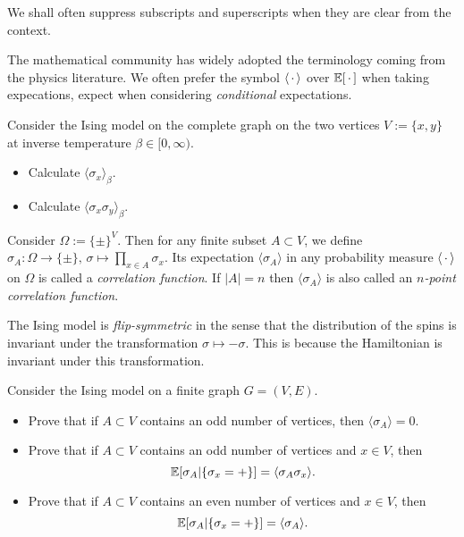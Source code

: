 \begin{remark*}
    We shall often suppress subscripts and superscripts when they are clear from the context.
\end{remark*}

\begin{remark*}
    The mathematical community has widely adopted the terminology coming from the physics
    literature.
    We often prefer the symbol $\langle\,\cdot\,\rangle$ over $\mathbb E[\,\cdot\,]$ when taking expecations,
    expect when considering \emph{conditional} expectations.
\end{remark*}

\begin{exercise}
    Consider the Ising model on the complete graph on the two vertices $V:=\{x,y\}$
    at inverse temperature $\beta\in[0,\infty)$.
    \begin{itemize}
        \item Calculate $\langle\sigma_x\rangle_\beta$.
        \item Calculate $\langle\sigma_x\sigma_y\rangle_\beta$.
    \end{itemize}
\end{exercise}

\begin{definition}
    Consider $\Omega:=\{\pm\}^V$.
    Then for any finite subset $A\subset V$,
    we define $\sigma_A:\Omega\to\{\pm\},\,\sigma\mapsto\prod_{x\in A}\sigma_x$.
    Its expectation $\langle\sigma_A\rangle$ in any probability measure $\langle\,\cdot\,\rangle$
    on $\Omega$ is called a \emph{correlation function}.
    If $|A|=n$ then $\langle\sigma_A\rangle$ is also called an \emph{$n$-point correlation function}.
\end{definition}

\begin{remark*}
    The Ising model is \emph{flip-symmetric} in the sense that the distribution of the spins is invariant under the transformation $\sigma\mapsto-\sigma$.
    This is because the Hamiltonian is invariant under this transformation.
\end{remark*}

\begin{exercise}
    \label{exercise:flip-symmetry}
    Consider the Ising model on a finite graph $G=(V,E)$.
    \begin{itemize}
        \item Prove that if $A\subset V$ contains an odd number of vertices,
        then $\langle\sigma_A\rangle=0$.
        \item Prove that if $A\subset V$ contains an odd number of vertices
        and $x\in V$,
        then \[\mathbb E[\sigma_A|\{\sigma_x=+\}]=\langle \sigma_{A}\sigma_x\rangle.\]
        \item Prove that if $A\subset V$ contains an even number of vertices
        and $x\in V$,
        then \[\mathbb E[\sigma_A|\{\sigma_x=+\}]=\langle \sigma_{A}\rangle.\]
    \end{itemize}
\end{exercise}

